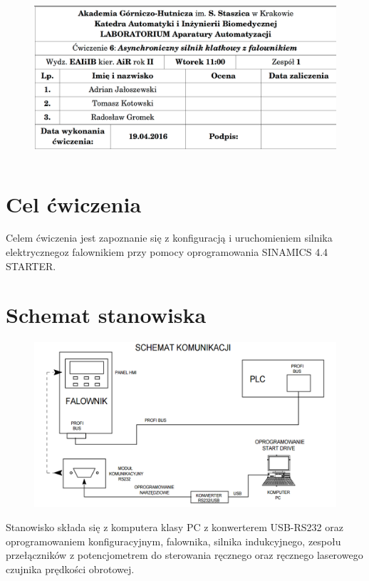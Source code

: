 \documentclass[a4paper, 12pt]{article}
\begin{document}
	\begin{figure}[H]
		\centering
		\includegraphics[height=6cm, width=\textwidth]{./img/cudo.png}
	\end{figure}
	\section{Cel ćwiczenia}
		Celem ćwiczenia jest zapoznanie się z konfiguracją i uruchomieniem silnika elektrycznego\linebreak z falownikiem przy pomocy oprogramowania SINAMICS 4.4 STARTER.
	\section{Schemat stanowiska}
		\begin{figure}[H]
			\centering
			\includegraphics[width=\textwidth]{./img/stanowisko.png}
		\end{figure}
		Stanowisko składa się z komputera klasy PC z konwerterem USB-RS232 oraz oprogramowaniem konfiguracyjnym, falownika, silnika indukcyjnego, zespołu przełączników z potencjometrem do sterowania ręcznego oraz ręcznego laserowego czujnika prędkości obrotowej.
\end{document}
